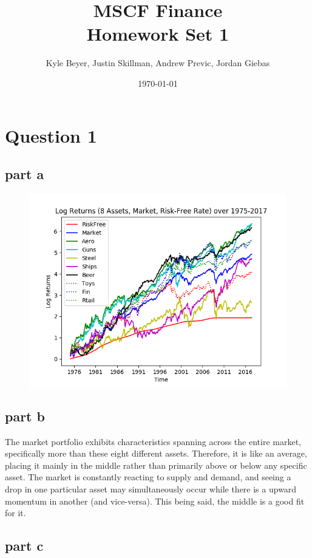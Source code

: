 \documentclass[12pt]{article}
\title{MSCF Finance\\ Homework Set 1}
\author{
        Kyle Beyer, 
        Justin Skillman,
        Andrew Previc,
        Jordan Giebas
}
\date{\today}
\begin{document}
\maketitle

\section{Question 1}

	\subsection{part a}

		\begin{figure}[h]
		\centering
			\includegraphics[scale=0.75]{hw1_image1.png}
		\end{figure}

	\subsection{part b}
		
		The market portfolio exhibits characteristics spanning across the entire market, specifically more than these eight different assets. Therefore,
		it is like an average, placing it mainly in the middle rather than primarily above or below any specific asset. The market is constantly reacting to 
		supply and demand, and seeing a drop in one particular asset may simultaneously occur while there is a upward momentum in another (and vice-versa). 
		This being said, the middle is a good fit for it. 
		
	\subsection{part c}
	
\end{document}
